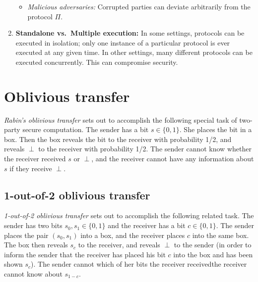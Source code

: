 \begin{enumerate}
\begin{itemize}
      \item \emph{Malicious adversaries:} Corrupted parties can deviate arbitrarily
        from the protocol $\Pi$.
    \end{itemize}

  \item \textbf{Standalone vs.\ Multiple execution:} In some settings, protocols
    can be executed in isolation; only one instance of a particular protocol
    is ever executed at any given time. In other settings, many different protocols
    can be executed concurrently. This can compromise security.
\end{enumerate}







\section{Oblivious transfer}

\emph{Rabin's oblivious transfer} sets out to accomplish the following special task of two-party secure computation. The sender has a bit $s \in \{0,1\}$. She places the bit in a box. Then the box reveals the bit to the receiver with probability 1/2, and reveals $\perp$ to the receiver with probability 1/2. The sender cannot know whether the receiver received $s$ or $\perp$, and the receiver cannot have any information about $s$ if they receive $\perp$.

\subsection{1-out-of-2 oblivious transfer}
\emph{1-out-of-2 oblivious transfer} sets out to accomplish the following related task. The sender has two bits $s_0, s_1 \in \{0,1\}$ and the receiver has a bit $c \in \{0,1\}$. The sender places the pair $(s_0, s_1)$ into a box, and the receiver places $c$ into the same box. The box then reveals $s_c$ to the receiver, and reveals $\perp$ to the sender (in order to inform the sender that the receiver has placed his bit $c$ into the box and has been shown $s_c$). The sender cannot \DIFdelbegin {}\DIFdelend \DIFaddbegin {}\DIFaddend which of her bits the receiver received\DIFdelbegin {}\DIFdelend \DIFaddbegin {}\DIFaddend the receiver cannot know \DIFdelbegin {}\DIFdelend \DIFaddbegin {}\DIFaddend about $s_{1-c}$. \DIFaddbegin {}\DIFaddend 

